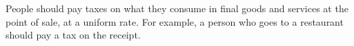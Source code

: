 People should pay taxes on what they consume in final goods and services at the point of sale, at a uniform rate.
For example, a person who goes to a restaurant should pay a tax on the receipt.
